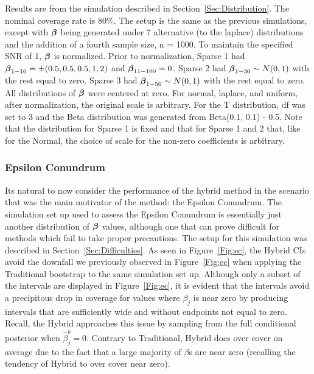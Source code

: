 \begin{table}[hbtp]
  \centering
  
  \caption{\label{Tab:dist_beta} Results are from the simulation described in Section~\ref{Sec:Distribution}. The nominal coverage rate is 80\%. The setup is the same as the previous simulations, except with $\boldsymbol{\beta}$ being generated under 7 alternative (to the laplace) distributions and the addition of a fourth sample size, n = 1000. To maintain the specified SNR of 1, $\boldsymbol{\beta}$ is normalized. Prior to normalization, Sparse 1 had $\boldsymbol{\beta}_{1-10} = \pm(0.5, 0.5, 0.5, 1, 2)$ and $\boldsymbol{\beta}_{11-100} = 0$. Sparse 2 had $\boldsymbol{\beta}_{1-30} \sim N(0, 1)$ with the rest equal to zero.  Sparse 3 had $\boldsymbol{\beta}_{1-50} \sim N(0, 1)$ with the rest equal to zero. All distributions of $\boldsymbol{\beta}$ were centered at zero. For normal, laplace, and uniform, after normalization, the original scale is arbitrary. For the T distribution, df was set to 3 and the Beta distribution was generated from Beta(0.1, 0.1) - 0.5. Note that the distribution for Sparse 1 is fixed and that for Sparse 1 and 2 that, like for the Normal, the choice of scale for the non-zero coefficients is arbitrary.}
\end{table}

\subsubsection{Epsilon Conundrum}\label{Sec:Epsilon}


Its natural to now consider the performance of the hybrid method in the scenario that was the main motivator of the method: the Epsilon Conundrum. The simulation set up used to assess the Epsilon Conundrum is essentially just another distribution of $\boldsymbol{\beta}$ values, although one that can prove difficult for methods which fail to take proper precautions. The setup for this simulation was described in Section~\ref{Sec:Difficulties}. As seen in Figure~\ref{Fig:ec}, the Hybrid CIs avoid the downfall we previously observed in Figure~\ref{Fig:ec} when applying the Traditional bootstrap to the same simulation set up. Although only a subset of the intervals are displayed in Figure~\ref{Fig:ec}, it is evident that the intervals avoid a precipitous drop in coverage for values where $\beta_j$ is near zero by producing intervals that are sufficiently wide and without endpoints not equal to zero. Recall, the Hybrid approaches this issue by sampling from the full conditional posterior when $\hat{\beta}_j^b = 0$. Contrary to Traditional, Hybrid does over cover on average due to the fact that a large majority of $\beta$s are near zero (recalling the tendency of Hybrid to over cover near zero).

